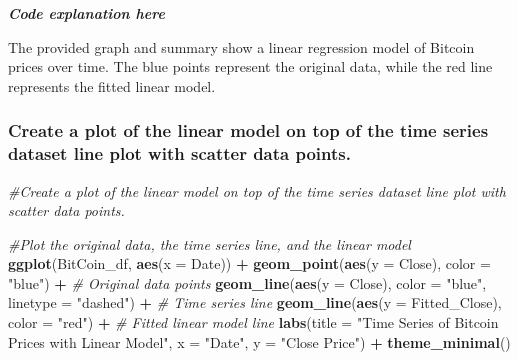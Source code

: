 \documentclass[
]{book}
\newenvironment{Shaded}{\begin{snugshade}}{\end{snugshade}}
\newcommand{\AttributeTok}[1]{\textcolor[rgb]{0.13,0.29,0.53}{#1}}
\newcommand{\CommentTok}[1]{\textcolor[rgb]{0.56,0.35,0.01}{\textit{#1}}}
\newcommand{\FunctionTok}[1]{\textcolor[rgb]{0.13,0.29,0.53}{\textbf{#1}}}
\newcommand{\NormalTok}[1]{#1}
\newcommand{\SpecialCharTok}[1]{\textcolor[rgb]{0.81,0.36,0.00}{\textbf{#1}}}
\newcommand{\StringTok}[1]{\textcolor[rgb]{0.31,0.60,0.02}{#1}}
\begin{document}
\emph{\textbf{Code explanation here}}

The provided graph and summary show a linear regression model of Bitcoin prices over time. The blue points represent the original data, while the red line represents the fitted linear model.

\subsubsection{Create a plot of the linear model on top of the time series dataset line plot with scatter data points.}\label{create-a-plot-of-the-linear-model-on-top-of-the-time-series-dataset-line-plot-with-scatter-data-points.}

\begin{Shaded}
\begin{Highlighting}[]
\CommentTok{\#Create a plot of the linear model on top of the time series dataset line plot with scatter data points.}
  
\CommentTok{\#Plot the original data, the time series line, and the linear model}
\FunctionTok{ggplot}\NormalTok{(BitCoin\_df, }\FunctionTok{aes}\NormalTok{(}\AttributeTok{x =}\NormalTok{ Date)) }\SpecialCharTok{+}
\FunctionTok{geom\_point}\NormalTok{(}\FunctionTok{aes}\NormalTok{(}\AttributeTok{y =}\NormalTok{ Close), }\AttributeTok{color =} \StringTok{"blue"}\NormalTok{) }\SpecialCharTok{+}  \CommentTok{\# Original data points}
\FunctionTok{geom\_line}\NormalTok{(}\FunctionTok{aes}\NormalTok{(}\AttributeTok{y =}\NormalTok{ Close), }\AttributeTok{color =} \StringTok{"blue"}\NormalTok{, }\AttributeTok{linetype =} \StringTok{"dashed"}\NormalTok{) }\SpecialCharTok{+}  \CommentTok{\# Time series line}
\FunctionTok{geom\_line}\NormalTok{(}\FunctionTok{aes}\NormalTok{(}\AttributeTok{y =}\NormalTok{ Fitted\_Close), }\AttributeTok{color =} \StringTok{"red"}\NormalTok{) }\SpecialCharTok{+}  \CommentTok{\# Fitted linear model line}
\FunctionTok{labs}\NormalTok{(}\AttributeTok{title =} \StringTok{"Time Series of Bitcoin Prices with Linear Model"}\NormalTok{,}
     \AttributeTok{x =} \StringTok{"Date"}\NormalTok{,}
     \AttributeTok{y =} \StringTok{"Close Price"}\NormalTok{) }\SpecialCharTok{+}
\FunctionTok{theme\_minimal}\NormalTok{() }
\end{Highlighting}
\end{Shaded}
\end{document}

